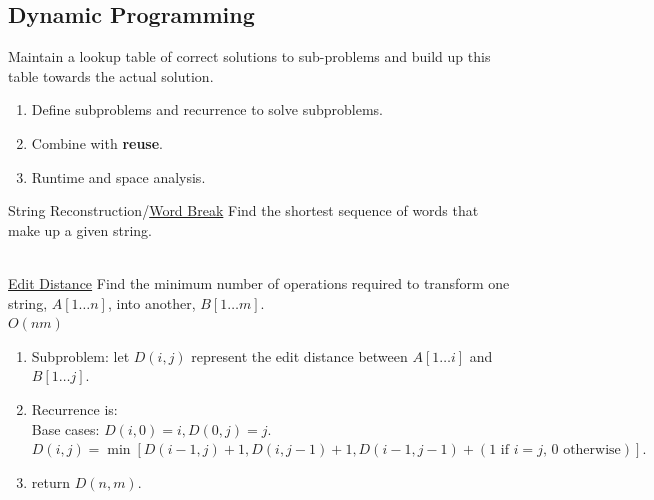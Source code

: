 \documentclass[10pt,a4paper]{article}
\begin{document}
\begin{multicols}{3}
\section{Dynamic Programming}

\begin{textbox}{}
 Maintain a lookup table of correct solutions to sub-problems and build up this table towards the actual solution.\\
\begin{enumerate}
    \item Define subproblems and recurrence to solve subproblems.
    \item Combine with {\bf reuse}.
    \item Runtime and space analysis.
\end{enumerate}
\end{textbox}

\begin{textbox}{String Reconstruction/\href{https://leetcode.com/problems/word-break/}{Word Break}}
    Find the shortest sequence of words that make up a given string.\\
  \\
\end{textbox}

\begin{textbox}{\href{https://leetcode.com/problems/edit-distance/}{Edit Distance}}
    Find the minimum number of operations required to transform one string, $A[1\ldots n]$, into another, $B[1\ldots m]$. \\
  $O(nm)$
\begin{enumerate}
    \item Subproblem: let $D(i,j)$ represent the edit distance between $A[1\ldots i]$ and $B[1\ldots j]$.
    \item Recurrence is: \\
    Base cases: $D(i,0) = i, D(0,j) = j.$ \\
    $D(i,j) = \min[D(i-1,j)+1,D(i,j-1)+1,D(i-1,j-1)+ (1 \text { if } i = j \text {, $0$ otherwise})].$
    \item return $D(n,m)$.
\end{enumerate}
\end{textbox}


\end{multicols}
\end{document}
